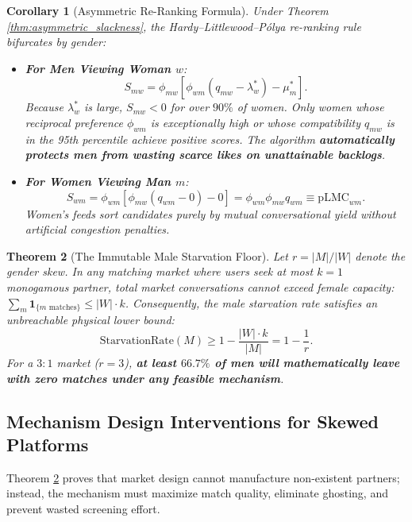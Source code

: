 \documentclass[11pt,letterpaper]{article}
\theoremstyle{definition}
\theoremstyle{plain}
\newtheorem{theorem}{Theorem}[section]
\newtheorem{corollary}[theorem]{Corollary}
\theoremstyle{remark}
\begin{document}
\begin{corollary}[Asymmetric Re-Ranking Formula]
Under Theorem \ref{thm:asymmetric_slackness}, the Hardy--Littlewood--P\'olya re-ranking rule bifurcates by gender:
\begin{itemize}[leftmargin=1.5em]
    \item \textbf{For Men Viewing Woman $w$}:
    \begin{equation}
        S_{mw} = \phi_{mw} \left[ \phi_{wm}(q_{mw} - \lambda_w^*) - \mu_m^* \right].
    \end{equation}
    Because $\lambda_w^*$ is large, $S_{mw} < 0$ for over $90\%$ of women. Only women whose reciprocal preference $\phi_{wm}$ is exceptionally high or whose compatibility $q_{mw}$ is in the 95th percentile achieve positive scores. The algorithm \textbf{automatically protects men from wasting scarce likes on unattainable backlogs}.
    \item \textbf{For Women Viewing Man $m$}:
    \begin{equation}
        S_{wm} = \phi_{wm} \left[ \phi_{mw}(q_{wm} - 0) - 0 \right] = \phi_{wm} \phi_{mw} q_{wm} \equiv \mathrm{pLMC}_{wm}.
    \end{equation}
    Women's feeds sort candidates purely by mutual conversational yield without artificial congestion penalties.
\end{itemize}
\end{corollary}

\begin{theorem}[The Immutable Male Starvation Floor]
\label{thm:starvation_floor}
Let $r = |M|/|W|$ denote the gender skew. In any matching market where users seek at most $k=1$ monogamous partner, total market conversations cannot exceed female capacity: $\sum_{m} \mathbf{1}_{\{m \text{ matches}\}} \le |W| \cdot k$.
Consequently, the male starvation rate satisfies an unbreachable physical lower bound:
\begin{equation}
    \mathrm{StarvationRate}(M) \ge 1 - \frac{|W| \cdot k}{|M|} = 1 - \frac{1}{r}.
\end{equation}
For a $3:1$ market ($r=3$), \textbf{at least $66.7\%$ of men will mathematically leave with zero matches under any feasible mechanism}.
\end{theorem}

\subsection{Mechanism Design Interventions for Skewed Platforms}
Theorem \ref{thm:starvation_floor} proves that market design cannot manufacture non-existent partners; instead, the mechanism must maximize match quality, eliminate ghosting, and prevent wasted screening effort.
\end{document}
